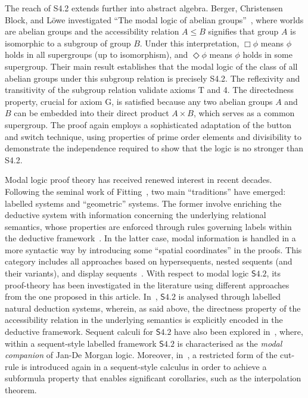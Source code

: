 \documentclass{article}
\newcommand{\logic}{\mathsf{S4.2}}
\theoremstyle{definition}
\begin{document}
{The reach of S4.2 extends further into abstract algebra. Berger, Christensen Block, and L\"owe investigated ``The modal logic of abelian groups''~\cite{Berger2023:ModalAbelian}, where worlds are abelian groups and the accessibility relation $A \leq B$ signifies that group $A$ is isomorphic to a subgroup of group $B$. Under this interpretation, $\Box\phi$ means $\phi$ holds in all supergroups (up to isomorphism), and $\Diamond\phi$ means $\phi$ holds in some supergroup. Their main result establishes that the modal logic of the class of all abelian groups under this subgroup relation is precisely S4.2. The reflexivity and transitivity of the subgroup relation validate axioms T and 4. The directedness property, crucial for axiom G, is satisfied because any two abelian groups $A$ and $B$ can be embedded into their direct product $A \times B$, which serves as a common supergroup. The proof again employs a sophisticated adaptation of the button and switch technique, using properties of prime order elements and divisibility to demonstrate the independence required to show that the logic is no stronger than S4.2.
}


Modal logic proof theory has received renewed interest in recent decades. Following the seminal work of Fitting~\cite{Fitting83,Fitting12}, two main ``traditions'' have emerged: labelled systems and ``geometric'' systems. The former involve enriching the deductive system with information concerning the underlying relational semantics, whose properties are enforced through rules governing labels within the deductive framework~\cite{Vigano1997:LabelledLogics, Negri:2011}. In the latter case, modal information is handled in a more syntactic way by introducing some ``spatial coordinates'' in the proofs. This category includes all approaches based on hypersequents, nested sequents (and their variants), and display sequents~\cite{Lellmann15, Wansing1999:PredicateDisplay,Ciabattoni2014:HypersequentDisplay}. With respect to modal logic $\logic$, its proof-theory has been investigated in the literature using different approaches from the one proposed in this article.
In~\cite{Vigano1997:LabelledLogics,Basin1998:NonClassical}, $\logic$ is analysed through labelled natural deduction systems, wherein, as said above, the directness property of the accessibility relation in the underlying semantics is explicitly encoded in the deductive framework. Sequent calculi for $\logic$ have also been explored in~\cite{Dyckhoff2012:AdmissibilityModal}, where, within a sequent-style labelled framework $\logic$ is characterised as the \emph{modal companion} of \textsf{Jan-De Morgan} logic. Moreover, in~\cite{Takano2019:S42Subformula}, a restricted form of the cut-rule is introduced again in a sequent-style calculus in order to achieve a subformula property that enables significant corollaries, such as the interpolation theorem.
\end{document}
